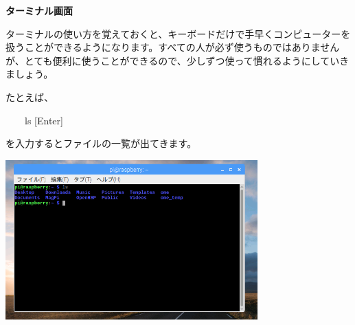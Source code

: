 \documentclass[a4paper,dvipdfmx]{jarticle}
\newcommand\textstyleqwerty[1]{#1}
\begin{document}
\bigskip


\bigskip


\bigskip


\bigskip


\bigskip


\bigskip


\bigskip


\bigskip


\bigskip

\textstyleqwerty{\textbf{ターミナル画面}}


\bigskip


\bigskip


\bigskip


\bigskip


\bigskip

ターミナルの使い方を覚えておくと、キーボードだけで手早くコンピューターを扱うことができるようになります。すべての人が必ず使うものではありませんが、とても便利に使うことができるので、少しずつ使って慣れるようにしていきましょう。


\bigskip

たとえば、


\bigskip

\ \ \ \ ls [Enter]


\bigskip

を入力するとファイルの一覧が出てきます。


\bigskip



\begin{center}
\includegraphics[width=9.71cm,height=6.138cm]{text02-img/text02-img005.png}

\end{center}

\bigskip


\bigskip


\bigskip


\bigskip
\end{document}
